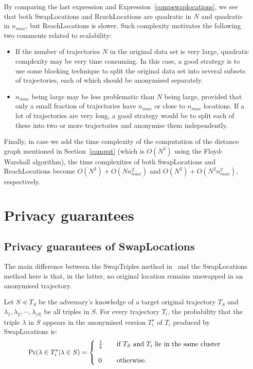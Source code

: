 By comparing the last expression and Expression~\ref{compswaplocations},
we see that both SwapLocations and ReachLocations are quadratic in
$N$ and quadratic in $n_{max}$, but ReachLocations is slower.
Such complexity motivates the following two comments
related to scalability:
\begin{itemize}
\item If the number of trajectories $N$ in the original data set is very large,
quadratic complexity may be very time consuming. In this case, a good
strategy is to use some blocking technique to split the original data set
into several subsets of trajectories, each of which should be anonymised
separately.
\item $n_{max}$ being large may be less problematic than $N$ being large,
provided that only a small fraction of trajectories have $n_{max}$ or close
to $n_{max}$ locations. If a lot of trajectories are very long, a good
strategy would be to split each of these into two or more trajectories and anonymise them independently.
\end{itemize}

Finally, in case we add the time complexity of the computation of the
distance graph mentioned in Section~\ref{comput} (which
is $O(N^3)$ using the Floyd-Warshall algorithm), the time complexities
of both SwapLocations and ReachLocations become
$O(N^3) + O(N n^2_{max})$ and $O(N^3) + O(N^2 n^2_{max})$, respectively.

\section{Privacy guarantees}
\label{sec:guarantees}

\subsection{Privacy guarantees of SwapLocations}
\label{sec:guaranteesswaploc}

The main difference between the SwapTriples method
in~\cite{domingo10springl} and the SwapLocations method here
is that, in the latter, no original location
remains unswapped in an anonymised trajectory.

\begin{proposition} \label{prop:prob}
Let $S \preceq T_S$ be the adversary's knowledge of a target
original trajectory $T_S$ and
$\lambda_1, \lambda_2, \cdots, \lambda_{|S|}$ be all triples in $S$.
For every trajectory $T_i$, the probability
that the triple $\lambda$ in $S$ appears in the anonymised version $T_i^{\star}$ of $T_i$ produced by SwapLocations is:
$$
\Pr(\lambda \in T_i^{\star}|\lambda \in S)  = \left\{\begin{array}{l l}
\frac{1}{k} &  \quad \text{if } T_S \text{ and } T_i \mbox{ lie in the same cluster}\\
\\
0 & \quad \mbox{otherwise.}
\end{array}\right.
$$
\end{proposition}

